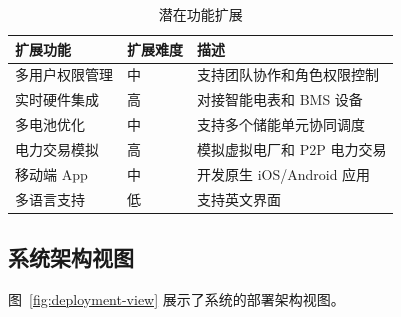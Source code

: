 \begin{table}[htbp]
    \centering
    \caption{潜在功能扩展}
    \label{tab:future-features}
    \begin{tabularx}{\textwidth}{@{}l l X@{}}
        \toprule
        \textbf{扩展功能} & \textbf{扩展难度} & \textbf{描述}         \\
        \midrule
        多用户权限管理       & 中             & 支持团队协作和角色权限控制       \\
        实时硬件集成        & 高             & 对接智能电表和 BMS 设备      \\
        多电池优化         & 中             & 支持多个储能单元协同调度        \\
        电力交易模拟        & 高             & 模拟虚拟电厂和 P2P 电力交易    \\
        移动端 App       & 中             & 开发原生 iOS/Android 应用 \\
        多语言支持         & 低             & 支持英文界面              \\
        \bottomrule
    \end{tabularx}
\end{table}

\subsection{系统架构视图}

图~\ref{fig:deployment-view} 展示了系统的部署架构视图。

